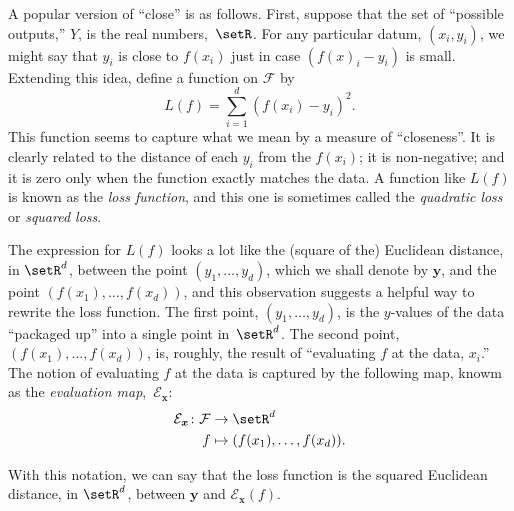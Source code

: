 \documentclass[10pt, a4paper]{article}
\begin{document}
A popular version of “close” is as follows. First, suppose that the
set of “possible outputs,” $Y$, is the real numbers,~$\setR$. For any
particular datum, $(x_i, y_i)$, we might say that $y_i$ is close to
$f(x_i)$ just in case $( f(x)_i-y_i )$ is small. Extending this idea,
define a function on $\mathcal{F}$ by
\[
L(f) = \sum_{i=1}^d{(f(x_i) - y_i)}^2.
\]
This function seems to capture what we mean by a measure of
“closeness”. It is clearly related to the distance of each $y_i$ from
the $f(x_i)$; it is non-negative; and it is zero only when the
function exactly matches the data. A function like $L(f)$ is known as
the \emph{loss function}, and this one is sometimes called the
\emph{quadratic loss} or \emph{squared loss}.

The expression for $L(f)$ looks a lot like the (square of the)
Euclidean distance, in $\setR^d$, between the point
$(y_1, \dotsc, y_d)$, which we shall denote by $\bm{y}$, and the point
$(f(x_1), \dotsc, f(x_d))$, and this observation suggests a helpful
way to rewrite the loss function. The first point,
$(y_1, \dotsc, y_d)$, is the $y$-values of the data “packaged up” into
a single point in~$\setR^d$. The second point,
$(f(x_1), \dotsc, f(x_d))$, is, roughly, the result of “evaluating $f$
at the data, $x_i$.” The notion of evaluating $f$ at the data is
captured by the following map, knowm as the \emph{evaluation
  map},~$\mathcal{E}_{\bm{x}}$:
\[
  \begin{aligned}
    \mathcal{E}_{\bm{x}} \colon \mathcal{F} &\to \setR^d \\
    f &\mapsto (f(x_1), \dotsc, f(x_d)).
  \end{aligned}
\]

With this notation, we can say that the loss function is the squared
Euclidean distance, in $\setR^d$, between $\bm{y}$ and
$\mathcal{E}_{\bm{x}}(f)$.
\end{document}
